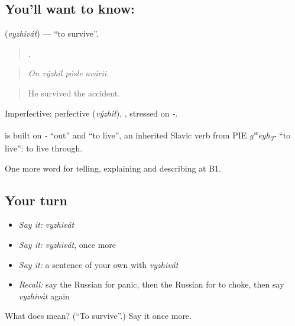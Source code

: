 \subsection*{You'll want to know: }
\textbf{} (\emph{vyzhivát}) — \textquotedblleft{}to survive\textquotedblright{}.

\begin{quote}
   .
\end{quote}

\begin{quote}
\emph{On výzhil pósle avárii.}
\end{quote}

\begin{quote}
He survived the accident.
\end{quote}

Imperfective; perfective \emph{} (\emph{výzhit}), \emph{}, stressed on \emph{-}.

\begin{cousinweb}
\emph{} is built on \emph{-} \textquotedblleft{}out\textquotedblright{} and \emph{} \textquotedblleft{}to live\textquotedblright{}, an inherited Slavic verb from PIE \emph{g\textsuperscript{w}eyh\textsubscript{3}-} \textquotedblleft{}to live\textquotedblright{}: to live through.
\end{cousinweb}

\begin{grammarlens}[title={What you've built}]
One more word for telling, explaining and describing at B1.
\end{grammarlens}

\subsection*{Your turn}
\begin{itemize}
\raggedright
  \item \emph{Say it:} \emph{vyzhivát}
  \item \emph{Say it:} \emph{vyzhivát}, once more
  \item \emph{Say it:} a sentence of your own with \emph{vyzhivát}
  \item \emph{Recall:} say the Russian for panic, then the Russian for to choke, then say \emph{vyzhivát} again
\end{itemize}

\begin{tcolorbox}[breakable,colback=teal!4,colframe=teal!35!black,title={Before you move on}]
What does  mean? (\textquotedblleft{}To survive\textquotedblright{}.) Say it once more.
\end{tcolorbox}

